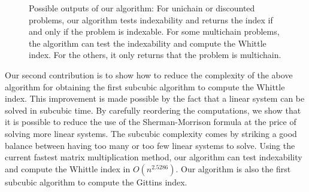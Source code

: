 \begin{figure}[ht]
    \centering
    \caption{Possible outputs of our algorithm: For unichain or discounted problems, our algorithm tests indexability and returns the index if and only if the problem is indexable. For some multichain problems, the algorithm can test the indexability and compute the Whittle index. For the others, it only returns that the problem is multichain.}
    \label{fig:possible_outputs}
\end{figure}

Our second contribution is to show how to reduce the complexity of the above algorithm for obtaining the first subcubic algorithm to compute the Whittle index. This improvement is made possible by the fact that a linear system can be solved in subcubic time. By carefully reordering the computations, we show that it is possible to reduce the use of the Sherman-Morrison formula at the price of solving more linear systems. The subcubic complexity comes by striking a good balance between having too many or too few linear systems to solve. Using the current fastest matrix multiplication method, our algorithm can test indexability and compute the Whittle index in $O(n^{2.5286})$. Our algorithm is also the first subcubic algorithm to compute the Gittins index.

